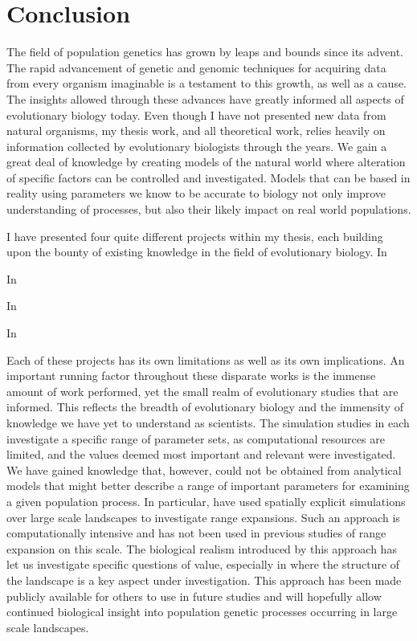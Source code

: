 \chapter{Conclusion}
\label{chap:conclusions}

The field of population genetics has grown by leaps and bounds since its advent. The rapid advancement of genetic and genomic techniques for acquiring data from every organism imaginable is a testament to this growth, as well as a cause. The insights allowed through these advances have greatly informed all aspects of evolutionary biology today. Even though I have not presented new data from natural organisms, my thesis work, and all theoretical work, relies heavily on information collected by evolutionary biologists through the years. We gain a great deal of knowledge by creating models of the natural world where alteration of specific factors can be controlled and investigated. Models that can be based in reality using parameters we know to be accurate to biology not only improve understanding of processes, but also their likely impact on real world populations.

I have presented four quite different projects within my thesis, each building upon the bounty of existing knowledge in the field of evolutionary biology. In 

In 

In 

In 

Each of these projects has its own limitations as well as its own implications. An important running factor throughout these disparate works is the immense amount of work performed, yet the small realm of evolutionary studies that are informed. This reflects the breadth of evolutionary biology and the immensity of knowledge we have yet to understand as scientists. The simulation studies in  each investigate a specific range of parameter sets, as computational resources are limited, and the values deemed most important and relevant were investigated. We have gained knowledge that, however, could not be obtained from analytical models that might better describe a range of important parameters for examining a given population process. In particular,  have used spatially explicit simulations over large scale landscapes to investigate range expansions. Such an approach is computationally intensive and has not been used in previous studies of range expansion on this scale. The biological realism introduced by this approach has let us investigate specific questions of value, especially in  where the structure of the landscape is a key aspect under investigation. This approach has been made publicly available for others to use in future studies and will hopefully allow continued biological insight into population genetic processes occurring in large scale landscapes.



